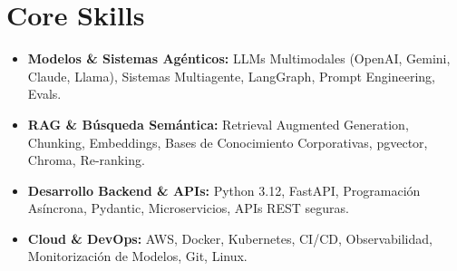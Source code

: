 \documentclass[a4paper,10pt]{article}
\begin{document}
\section{Core Skills}
\begin{itemize}
  \item \textbf{Modelos \& Sistemas Agénticos:} LLMs Multimodales (OpenAI, Gemini, Claude, Llama), Sistemas Multiagente, LangGraph, Prompt Engineering, Evals.
  \item \textbf{RAG \& Búsqueda Semántica:} Retrieval Augmented Generation, Chunking, Embeddings, Bases de Conocimiento Corporativas, pgvector, Chroma, Re-ranking.
  \item \textbf{Desarrollo Backend \& APIs:} Python 3.12, FastAPI, Programación Asíncrona, Pydantic, Microservicios, APIs REST seguras.
  \item \textbf{Cloud \& DevOps:} AWS, Docker, Kubernetes, CI/CD, Observabilidad, Monitorización de Modelos, Git, Linux.
\end{itemize}
\end{document}
